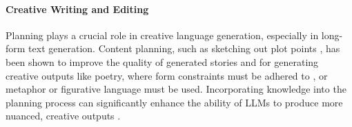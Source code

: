 \documentclass[11pt]{article}
\newcommand{\tenghao}[1]{{\color{red}[{TH:} #1]}}
\begin{document}

\paragraph{Creative Writing and Editing}

Planning plays a crucial role in creative language generation, especially in long-form text generation. Content planning, such as sketching out plot points \cite{yao2019plan, ammanabrolu2020story, clark2021choose}, has been shown to improve the quality of generated stories and for generating creative outputs like poetry, where form constraints must be adhered to \cite{tian2022zero}, or metaphor or figurative language \cite{chakrabarty2021mermaid} must be used. Incorporating knowledge into the planning process can significantly enhance the ability of LLMs to produce more nuanced, creative outputs \cite{bosselut2019comet, chakrabarty2024can}.



\end{document}
